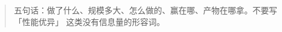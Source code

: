 \documentclass[logo, zh]{boogonreport}
\begin{document}
\maketitle

\begin{abstract}
五句话：做了什么、规模多大、怎么做的、赢在哪、产物在哪拿。不要写「性能优异」
这类没有信息量的形容词。
\end{abstract}

\tableofcontents
\newpage






\end{document}
